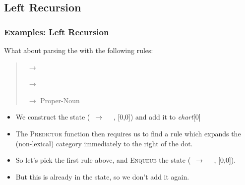 \subsection{Left Recursion}




\begin{frame}[fragile]
  \frametitle{Examples: Left Recursion}


What about parsing the \NP {}
with the following rules:
\begin{quote}
  \NP\ $\rightarrow$ \NP\ \PP

  \NP\ $\rightarrow$ \Det\ \Nom

  \NP\ $\rightarrow$ Proper-Noun

\end{quote}

\begin{itemize}
  \item We construct the state (\NP\ $\rightarrow$ \bigdot\ \NP\ \PP,
    [0,0]) and add it to \textit{chart}[0]
  \item The \textsc{Predictor} function then requires us to find a rule
    which expands the (non-lexical) category immediately to the right of
    the dot. 
  \item So let's pick the first rule above, and \textsc{Enqueue} the
    state (\NP\ $\rightarrow$ \bigdot\ \NP\ \PP, [0,0]).
  \item But this is already in the state, so we don't add it again. 
\end{itemize}



\end{frame}










